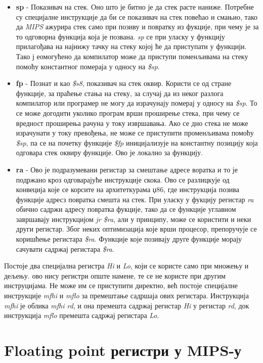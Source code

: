 \documentclass[12pt,oneside]{memoir}
\begin{document}
\begin{itemize}
  \item \textbf{sp} - Показивач на стек. Оно што је битно је да стек расте наниже. Потребне су специјалне инструкције да би се показивач на стек повећао и смањио, тако да \textit{MIPS} ажурира стек само при позиву и повратку из фукције, при чему је за то одговорна функција која је позвана. \textit{sp} се при уласку у функцију прилагођава на најнижу тачку на стеку којој ће да приступати у функцији. Тако ј еомогућено да компилатор може да приступи поменљивама на стеку помоћу константног помераја у односу на \textit{\$sp}.
  \item \textbf{fp} - Познат и као \textit{\$s8}, показивач на стек оквир. Користи се од стране функције, за праћење стања на стеку, за случај да из неког разлога компилатор или програмер не могу да израчунају померај у односу на \textit{\$sp}. То се може догодити уколико програм врши проширење стека, при чему се вредност проширења рачуна у току извршавања. Ако се дно стека не може израчунати у току превођења, не може се приступити променљивама помоћу \textit{\$sp}, па се на почетку функције \textit{\$fp} иницијализује на константну позицију која одговара стек оквиру функције. Ово је локално за функцију.
  \item \textbf{ra} - Ово је подразумевани регистар за смештање адресе воратка и то је подржано кроз одговарајуће инструкције скока. Ово се разлицкује од конвеција које се корсите на архитеткурама џ86, где инструкција позива функције адресз повратка смешта на стек. При уласку у фукцију регистар \textit{ra} обично садржи адресу повратка фукције, тако да се функције углавном завршавају инструкцијом \textit{jr \$ra}, али у принципу, може се користити и неки други регистар. Због неких оптимизација које врши процесор, препоручује се коришћење регистара \textit{\$ra}. Функције које позивају друге функције морају сачувати садржај регистара \textit{\$ra}.
\end{itemize}

\indent Постоје два специјална регистра \textit{Hi} и \textit{Lo}, који се користе само при множењу и дељењу. ово нису регистри опште намене, те се не користе при другим инструцијама. Не може им се приступити директно, већ постоје специјалне инструкције \textit{mfhi} и \textit{mflo} за премештање садршаја ових регистара. Инструкција \textit{mfhi} је облика \textit{mfhi rd}, и она премешта садржај регистар \textit{Hi} у регистар \textit{rd}, док инструкција \textit{mflo} премешта садржај регистара \textit{Lo}.


\section{Floating point регистри у MIPS-у}
\end{document}
